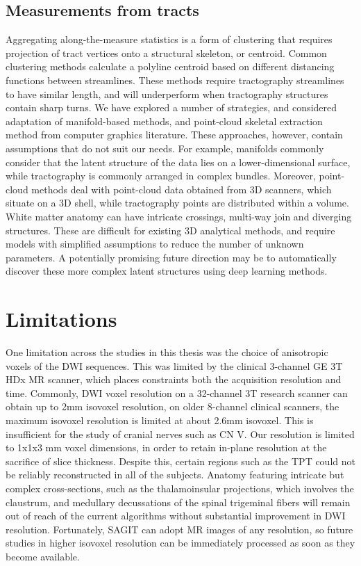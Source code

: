 \subsection{Measurements from tracts}
Aggregating along-the-measure statistics is a form of clustering that requires projection of tract vertices onto a structural skeleton, or centroid. Common clustering methods calculate a polyline centroid based on different distancing functions between streamlines. These methods require tractography streamlines to have similar length, and will underperform when tractography structures contain sharp turns. We have explored a number of strategies, and considered adaptation of manifold-based methods, and point-cloud skeletal extraction method from computer graphics literature. These approaches, however, contain assumptions that do not suit our needs. For example, manifolds commonly consider that the latent structure of the data lies on a lower-dimensional surface, while tractography is commonly arranged in complex bundles. Moreover, point-cloud methods deal with point-cloud data obtained from 3D scanners, which situate on a 3D shell, while tractography points are distributed within a volume. White matter anatomy can have intricate crossings, multi-way join and diverging structures. These are difficult for existing 3D analytical methods, and require models with simplified assumptions to reduce the number of unknown parameters. A potentially promising future direction may be to automatically discover these more complex latent structures using deep learning methods.

\section{Limitations}

One limitation across the studies in this thesis was the choice of anisotropic voxels of the DWI sequences. This was limited by the clinical 3-channel GE 3T HDx MR scanner, which places constraints both the acquisition resolution and time. Commonly, DWI voxel resolution on a 32-channel 3T research scanner can obtain up to 2mm isovoxel resolution, on older 8-channel clinical scanners, the maximum isovoxel resolution is limited at about 2.6mm isovoxel. This is insufficient for the study of cranial nerves such as CN V. Our resolution is limited to 1x1x3 mm voxel dimensions, in order to retain in-plane resolution at the sacrifice of slice thickness. Despite this, certain regions such as the TPT could not be reliably reconstructed in all of the subjects. Anatomy featuring intricate but complex cross-sections, such as the thalamoinsular projections, which involves the claustrum, and medullary decussations of the spinal trigeminal fibers will remain out of reach of the current algorithms without substantial improvement in DWI resolution. Fortunately, SAGIT can adopt MR images of any resolution, so future studies in higher isovoxel resolution can be immediately processed as soon as they become available. 

